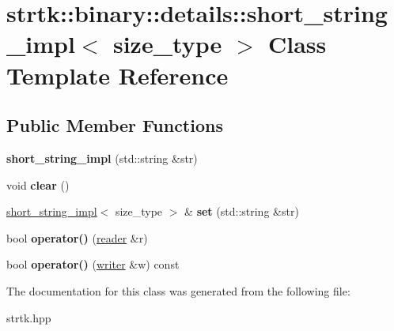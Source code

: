 \hypertarget{classstrtk_1_1binary_1_1details_1_1short__string__impl}{\section{strtk\-:\-:binary\-:\-:details\-:\-:short\-\_\-string\-\_\-impl$<$ size\-\_\-type $>$ Class Template Reference}
\label{classstrtk_1_1binary_1_1details_1_1short__string__impl}
}
\subsection*{Public Member Functions}
\begin{DoxyCompactItemize}
\item 
\hypertarget{classstrtk_1_1binary_1_1details_1_1short__string__impl_a73aec04594116bbae072de69e88771dc}{{\bfseries short\-\_\-string\-\_\-impl} (std\-::string \&str)}\label{classstrtk_1_1binary_1_1details_1_1short__string__impl_a73aec04594116bbae072de69e88771dc}

\item 
\hypertarget{classstrtk_1_1binary_1_1details_1_1short__string__impl_a74ffc13d756fe7f7413e6820e5b3370c}{void {\bfseries clear} ()}\label{classstrtk_1_1binary_1_1details_1_1short__string__impl_a74ffc13d756fe7f7413e6820e5b3370c}

\item 
\hypertarget{classstrtk_1_1binary_1_1details_1_1short__string__impl_a6a712e4f9fa33e80d2080082446baaa1}{\hyperlink{classstrtk_1_1binary_1_1details_1_1short__string__impl}{short\-\_\-string\-\_\-impl}$<$ size\-\_\-type $>$ \& {\bfseries set} (std\-::string \&str)}\label{classstrtk_1_1binary_1_1details_1_1short__string__impl_a6a712e4f9fa33e80d2080082446baaa1}

\item 
\hypertarget{classstrtk_1_1binary_1_1details_1_1short__string__impl_ae81d3563ab44dcee703e02fdb3077eb1}{bool {\bfseries operator()} (\hyperlink{classstrtk_1_1binary_1_1reader}{reader} \&r)}\label{classstrtk_1_1binary_1_1details_1_1short__string__impl_ae81d3563ab44dcee703e02fdb3077eb1}

\item 
\hypertarget{classstrtk_1_1binary_1_1details_1_1short__string__impl_a0e0359d21fbe85b7a765e1b0bc202e0e}{bool {\bfseries operator()} (\hyperlink{classstrtk_1_1binary_1_1writer}{writer} \&w) const }\label{classstrtk_1_1binary_1_1details_1_1short__string__impl_a0e0359d21fbe85b7a765e1b0bc202e0e}

\end{DoxyCompactItemize}


The documentation for this class was generated from the following file\-:\begin{DoxyCompactItemize}
\item 
strtk.\-hpp\end{DoxyCompactItemize}
